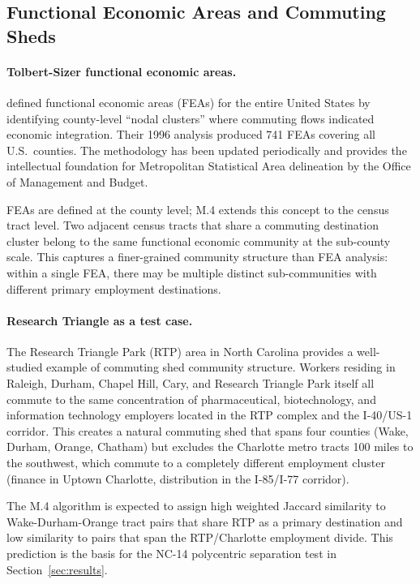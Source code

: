\subsection{Functional Economic Areas and Commuting Sheds}

\paragraph{Tolbert-Sizer functional economic areas.}
\citet{tolbert1996labor} defined functional economic areas (FEAs) for the
entire United States by identifying county-level ``nodal clusters'' where
commuting flows indicated economic integration.
Their 1996 analysis produced 741 FEAs covering all U.S.\ counties.
The methodology has been updated periodically and provides the intellectual
foundation for Metropolitan Statistical Area delineation by the Office
of Management and Budget.

FEAs are defined at the county level; M.4 extends this concept to the
census tract level.
Two adjacent census tracts that share a commuting destination cluster belong to
the same functional economic community at the sub-county scale.
This captures a finer-grained community structure than FEA analysis:
within a single FEA, there may be multiple distinct sub-communities with
different primary employment destinations.

\paragraph{Research Triangle as a test case.}
The Research Triangle Park (RTP) area in North Carolina provides a well-studied
example of commuting shed community structure.
Workers residing in Raleigh, Durham, Chapel Hill, Cary, and Research Triangle
Park itself all commute to the same concentration of pharmaceutical,
biotechnology, and information technology employers located in the RTP
complex and the I-40/US-1 corridor.
This creates a natural commuting shed that spans four counties (Wake, Durham,
Orange, Chatham) but excludes the Charlotte metro tracts 100 miles to the
southwest, which commute to a completely different employment cluster
(finance in Uptown Charlotte, distribution in the I-85/I-77 corridor).

The M.4 algorithm is expected to assign high weighted Jaccard similarity to
Wake-Durham-Orange tract pairs that share RTP as a primary destination
and low similarity to pairs that span the RTP/Charlotte employment divide.
This prediction is the basis for the NC-14 polycentric separation test
in Section~\ref{sec:results}.


